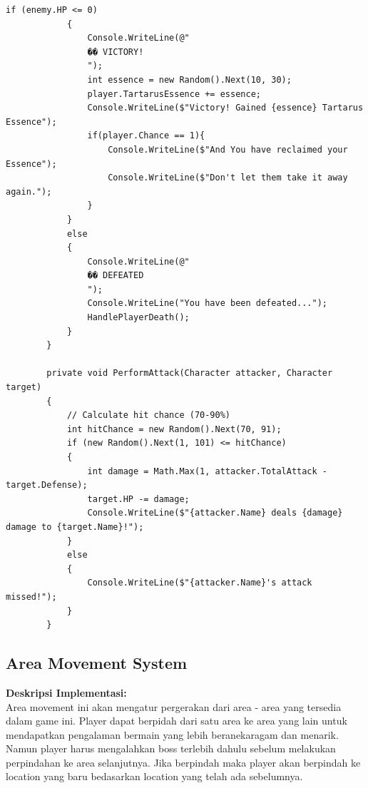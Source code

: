 \documentclass[12pt]{article}
\begin{document}
\begin{lstlisting}[language=CSharp, caption=Contoh Implementasi Combat System dengan Attack]
            if (enemy.HP <= 0)
            {
                Console.WriteLine(@"
                �� VICTORY!
                ");
                int essence = new Random().Next(10, 30);
                player.TartarusEssence += essence;
                Console.WriteLine($"Victory! Gained {essence} Tartarus Essence");
                if(player.Chance == 1){
                    Console.WriteLine($"And You have reclaimed your Essence");
                    Console.WriteLine($"Don't let them take it away again.");
                }
            }
            else
            {
                Console.WriteLine(@"
                �� DEFEATED
                ");
                Console.WriteLine("You have been defeated...");
                HandlePlayerDeath();
            }
        }

        private void PerformAttack(Character attacker, Character target)
        {
            // Calculate hit chance (70-90%)
            int hitChance = new Random().Next(70, 91);
            if (new Random().Next(1, 101) <= hitChance)
            {
                int damage = Math.Max(1, attacker.TotalAttack - target.Defense);
                target.HP -= damage;
                Console.WriteLine($"{attacker.Name} deals {damage} damage to {target.Name}!");
            }
            else
            {
                Console.WriteLine($"{attacker.Name}'s attack missed!");
            }
        }
\end{lstlisting}


\subsection{Area Movement System}
\textbf{Deskripsi Implementasi:} \\ 
Area movement ini akan mengatur pergerakan dari area - area yang tersedia dalam game ini. Player dapat berpidah dari satu area ke area yang lain untuk mendapatkan pengalaman bermain yang lebih beranekaragam dan menarik. Namun player harus mengalahkan boss terlebih dahulu sebelum melakukan perpindahan ke area selanjutnya. Jika berpindah maka player akan berpindah ke location yang baru bedasarkan location yang telah ada sebelumnya.
\end{document}
